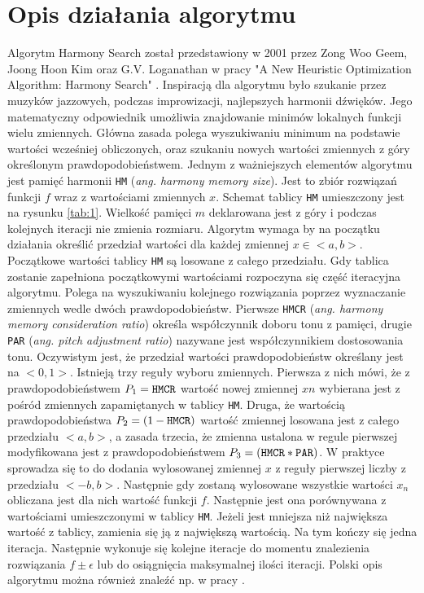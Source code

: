 \documentclass[10pt, a4paper]{article}
\begin{document}
\section{Opis działania algorytmu}
\label{sec:opis}
Algorytm Harmony Search został przedstawiony w 2001 przez Zong Woo Geem, Joong Hoon Kim oraz G.V. Loganathan w pracy "A New Heuristic Optimization Algorithm: Harmony Search" \cite{bib:orginal}. Inspiracją dla algorytmu było szukanie przez muzyków jazzowych, podczas improwizacji, najlepszych harmonii dźwięków. Jego matematyczny odpowiednik umożliwia znajdowanie minimów lokalnych funkcji wielu zmiennych. Główna zasada polega wyszukiwaniu minimum na podstawie wartości wcześniej obliczonych, oraz szukaniu nowych wartości zmiennych z góry określonym prawdopodobieństwem. Jednym z ważniejszych elementów algorytmu jest pamięć harmonii {\tt HM} ({\em ang. harmony memory size}). Jest to zbiór rozwiązań funkcji $f$ wraz z wartościami zmiennych $x$. Schemat tablicy {\tt HM} umieszczony jest na rysunku \ref{tab:1}. Wielkość pamięci $m$ deklarowana jest z góry i podczas kolejnych iteracji nie zmienia rozmiaru. Algorytm wymaga by na początku działania określić przedział wartości dla każdej zmiennej $x \in <a,b>$. Początkowe wartości tablicy {\tt HM} są losowane z całego przedziału. Gdy tablica zostanie zapełniona początkowymi wartościami rozpoczyna się część iteracyjna algorytmu. Polega na wyszukiwaniu kolejnego rozwiązania poprzez wyznaczanie zmiennych wedle dwóch prawdopodobieństw. Pierwsze {\tt HMCR} ({\em ang. harmony memory consideration ratio}) określa współczynnik doboru tonu z pamięci, drugie {\tt PAR} ({\em ang. pitch adjustment ratio}) nazywane jest współczynnikiem dostosowania tonu. Oczywistym jest, że przedział wartości prawdopodobieństw określany jest na $<0,1>$. Istnieją trzy reguły wyboru zmiennych. Pierwsza z nich mówi, że z prawdopodobieństwem $P_{1}={\tt HMCR}$ wartość nowej zmiennej $x{n}$ wybierana jest z pośród zmiennych zapamiętanych w tablicy {\tt HM}. Druga, że wartością prawdopodobieństwa $P_{2}=(1-{\tt HMCR})$ wartość zmiennej losowana jest z całego przedziału $<a,b>$, a zasada trzecia, że zmienna ustalona w regule pierwszej modyfikowana jest z prawdopodobieństwem $P_{3}=({\tt HMCR}*{\tt PAR})$. W praktyce sprowadza się to do dodania wylosowanej zmiennej $x$ z reguły pierwszej liczby z przedziału $<-b,b>$. Następnie gdy zostaną wylosowane wszystkie wartości $x_{n}$ obliczana jest dla nich wartość funkcji $f$. Następnie jest ona porównywana z wartościami umieszczonymi w tablicy {\tt HM}. Jeżeli jest mniejsza niż największa wartość z tablicy, zamienia się ją z największą wartością. Na tym kończy się jedna iteracja. Następnie wykonuje się kolejne iteracje do momentu znalezienia rozwiązania $f\pm \epsilon$ lub do osiągnięcia maksymalnej ilości iteracji. Polski opis algorytmu można również znaleźć np. w pracy \cite{bib:tlumaczenie}.
\end{document}
